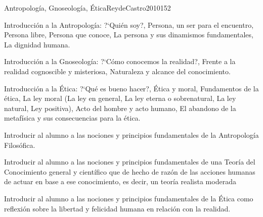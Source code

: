 \begin{syllabus}
\begin{unit}{Antropología, Gnoseología, Ética}{ReydeCastro2010}{15}{2}
\begin{topics}
	\item Introducción a la Antropología: ?`Quién soy?, Persona, un ser para el encuentro, Persona libre, Persona que conoce, La persona y sus dinamismos fundamentales, La dignidad humana.
	\item Introducción a la Gnoseología: ?`Cómo conocemos la realidad?, Frente a la realidad cognoscible y misteriosa, Naturaleza y alcance del conocimiento.
	\item Introducción a la Ética: ?`Qué es bueno hacer?, Ética y moral, Fundamentos de la ética, La ley moral (La ley en general, La ley eterna o sobrenatural, La ley natural, Ley positiva), Acto del hombre y acto humano, El abandono de la metafísica y sus consecuencias para la ética.
\end{topics}

\begin{learningoutcomes}
	\item Introducir al alumno a las nociones y principios fundamentales de la Antropología Filosófica.
	\item Introducir al alumno a las nociones y principios fundamentales de una Teoría del Conocimiento general y científico que de hecho de razón de las acciones humanas de actuar en base a ese conocimiento, es decir, un teoría realista moderada
	\item Introducir al alumno a las nociones y principios fundamentales de la Ética como reflexión sobre la libertad y felicidad humana en relación con la realidad.
\end{learningoutcomes}
\end{unit}


\end{syllabus}
